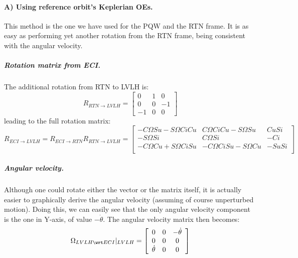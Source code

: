 		\paragraph{A) Using reference orbit's Keplerian OEs. \\}
		\indent This method is the one we have used for the PQW and the RTN frame. It is as easy as performing yet another rotation from the RTN frame, being consistent with the angular velocity.
			\subparagraph{Rotation matrix from ECI. \\}
			\indent The additional rotation from RTN to LVLH is:
			\[
			R_{RTN\to LVLH} = \left[ \begin{array}{ccc}
			0 			& 1 	& 0 \\
			0		    & 0 			& -1 \\
			-1 			& 0 			& 0
			\end{array}\right]
			\]
			\noindent leading to the full rotation matrix:
			\[
			R_{ECI\to LVLH} = R_{ECI\to RTN} R_{RTN\to LVLH} = \left[ \begin{array}{ccc}
			-C\Omega S u - S\Omega C i C u 			& C\Omega C i C u - S\Omega S u		& C u S i\\
			-S\Omega S i		    				& C\Omega S i 						& -C i \\
			-C\Omega C u + S\Omega C i S u 			& -C\Omega C i S u - S\Omega C u	& -S u S i\\
			\end{array}\right]
			\]
			\subparagraph{Angular velocity. \\}
			\indent Although one could rotate either the vector or the matrix itself, it is actually easier to graphically derive the angular velocity (assuming of course unperturbed motion). Doing this, we can easily see that the only angular velocity component is the one in Y-axis, of value $-\dot{\theta}$. The angular velocity matrix then becomes:
			\[
			\Omega_{LVLH\wrt ECI}\rvert_{LVLH} = \left[ \begin{array}{ccc}
			0 			& 0 			& -\dot{\theta}\\
			0 			& 0 			& 0 \\
			\dot{\theta}	& 0 			& 0
			\end{array}\right]
			\]
